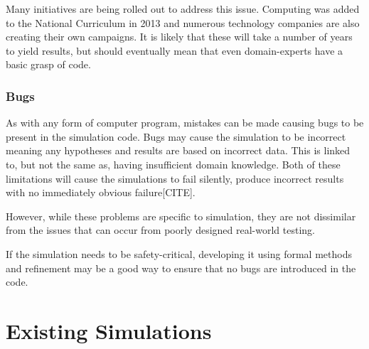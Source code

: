 \documentclass{UoYCSproject}
\begin{document}
Many initiatives are being rolled out to address this issue.
Computing was added to the National Curriculum in 2013\cite{national_curriculum, teacher_training} and numerous technology companies are also creating their own campaigns\cite{apple_education, microsoft_education}.
It is likely that these will take a number of years to yield results, but should eventually mean that even domain-experts have a basic grasp of code.

\subsubsection{Bugs}
As with any form of computer program, mistakes can be made causing bugs to be present in the simulation code.
Bugs may cause the simulation to be incorrect meaning any hypotheses and results are based on incorrect data.
This is linked to, but not the same as, having insufficient domain knowledge.
Both of these limitations will cause the simulations to fail silently, produce incorrect results with no immediately obvious failure[CITE].

However, while these problems are specific to simulation, they are not dissimilar from the issues that can occur from poorly designed real-world testing.

If the simulation needs to be safety-critical, developing it using formal methods and refinement may be a good way to ensure that no bugs are introduced in the code.

\section{Existing Simulations}
\end{document}
